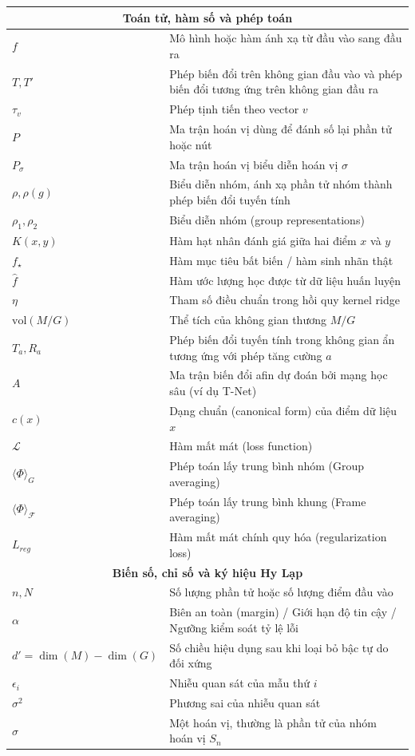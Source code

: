 \documentclass[oneside]{hcmus-report}
\theoremstyle{plain}
\theoremstyle{definition}
\begin{document}
\begin{longtable}{p{} p{}}
\multicolumn{2}{c}{\textbf{Toán tử, hàm số và phép toán}} \\
\hline
$f$ & Mô hình hoặc hàm ánh xạ từ đầu vào sang đầu ra \\
$T, T'$ & Phép biến đổi trên không gian đầu vào và phép biến đổi tương ứng trên không gian đầu ra \\
$\tau_v$ & Phép tịnh tiến theo vector $v$ \\
$P$ & Ma trận hoán vị dùng để đánh số lại phần tử hoặc nút \\
$P_\sigma$ & Ma trận hoán vị biểu diễn hoán vị $\sigma$ \\
$\rho, \rho(g)$ & Biểu diễn nhóm, ánh xạ phần tử nhóm thành phép biến đổi tuyến tính \\
$\rho_1, \rho_2$ & Biểu diễn nhóm (group representations) \\
$K(x, y)$ & Hàm hạt nhân đánh giá giữa hai điểm $x$ và $y$ \\
$f_{\star}$ & Hàm mục tiêu bất biến / hàm sinh nhãn thật \\
$\hat{f}$ & Hàm ước lượng học được từ dữ liệu huấn luyện \\
$\eta$ & Tham số điều chuẩn trong hồi quy kernel ridge \\
$\mathrm{vol}(M/G)$ & Thể tích của không gian thương $M/G$ \\
$T_a, R_a$ & Phép biến đổi tuyến tính trong không gian ẩn tương ứng với phép tăng cường $a$ \\
$A$ & Ma trận biến đổi afin dự đoán bởi mạng học sâu (ví dụ T-Net) \\
$c(x)$ & Dạng chuẩn (canonical form) của điểm dữ liệu $x$ \\
$\mathcal{L}$ & Hàm mất mát (loss function) \\
$\langle \Phi \rangle_G$ & Phép toán lấy trung bình nhóm (Group averaging) \\
$\langle \Phi \rangle_{\mathcal{F}}$ & Phép toán lấy trung bình khung (Frame averaging) \\
$L_{reg}$ & Hàm mất mát chính quy hóa (regularization loss) \\

\hline

\multicolumn{2}{c}{\textbf{Biến số, chỉ số và ký hiệu Hy Lạp}} \\
\hline
$n, N$ & Số lượng phần tử hoặc số lượng điểm đầu vào \\
$\alpha$ & Biên an toàn (margin) / Giới hạn độ tin cậy / Ngưỡng kiểm soát tỷ lệ lỗi \\
$d' = \dim(M) - \dim(G)$ & Số chiều hiệu dụng sau khi loại bỏ bậc tự do đối xứng \\
$\epsilon_i$ & Nhiễu quan sát của mẫu thứ $i$ \\
$\sigma^2$ & Phương sai của nhiễu quan sát \\
$\sigma$ & Một hoán vị, thường là phần tử của nhóm hoán vị $S_n$ \\

\hline
\end{longtable}
\end{document}

